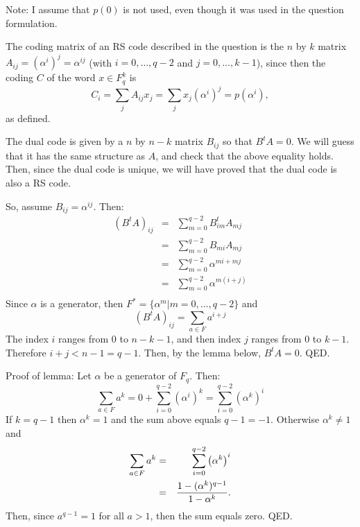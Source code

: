 \documentclass[11pt]{article} \usepackage{amssymb}
\begin{document}
\section{}
Note: I assume that $p(0)$ is not used, even though it was used in the 
question formulation.

The coding matrix of an RS code described in the question is the
$n$ by $k$ matrix $A_{ij}=\left(\alpha^i\right)^j=\alpha^{ij}$ (with $i=0,\ldots,q-2$ and $j=0,\ldots,k-1$), 
since then the coding $C$ of the word $x\in F_q^k$ is
\begin{equation*}
C_i = \sum_jA_{ij}x_j=\sum_jx_j\left(\alpha^i\right)^j=p(\alpha^i),
\end{equation*}
as defined.
  
The dual code is given by a $n$ by $n-k$ matrix $B_{ij}$ so that
$B^tA=0$. We will guess that it has the same structure as $A$, and check
that the above equality holds. Then, since the dual code is unique, we
will have proved that the dual code is also a RS code.

So, assume $B_{ij}=\alpha^{ij}$. Then: 
\begin{eqnarray*}
 (B^tA)_{ij}&=&\sum_{m=0}^{q-2}B^t_{im}A_{mj}\\
 &=& \sum_{m=0}^{q-2}B_{mi}A_{mj}\\
 &=& \sum_{m=0}^{q-2}\alpha^{mi+mj}\\
 &=& \sum_{m=0}^{q-2}\alpha^{m(i+j)}\\
\end{eqnarray*}
Since $\alpha$ is a generator, then $F^*=\{\alpha^m | m=0,\ldots,q-2\}$ and
\begin{equation*}
 (B^tA)_{ij} = \sum_{a\in F}a^{i+j}
\end{equation*}
The index $i$ ranges from $0$ to $n-k-1$, and then index $j$ ranges from
$0$ to $k - 1$. Therefore $i+j< n-1=q-1$.  Then, by the
lemma below, $B^tA=0$. QED.

Proof of lemma: Let $\alpha$ be a generator of $F_q$. Then:
\begin{equation*}
  \sum_{a\in F}a^k=0+\sum_{i=0}^{q-2}\left(\alpha^i\right)^k
=\sum_{i=0}^{q-2}\left(\alpha^k\right)^i
\end{equation*}
If $k=q-1$ then $\alpha^k=1$ and the sum above equals $q-1 = -1$.
Otherwise $\alpha^k\not = 1$ and
\begin{eqnarray*}
  \sum_{a\in F}a^k
  &=&\sum_{i=0}^{q-2}\left(\alpha^k\right)^i\\
  &=&{1-(\alpha^k)^{q-1}\over 1-\alpha^k}.\\
\end{eqnarray*}
Then, since $a^{q-1}=1$ for all $a>1$, then the sum equals zero. QED.
\end{document}
